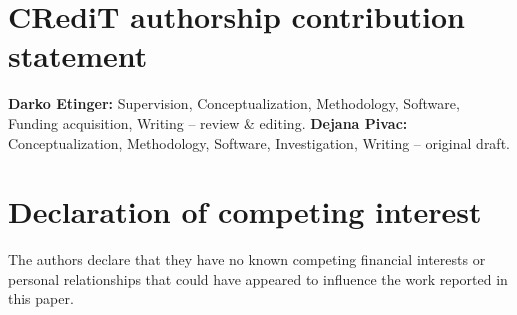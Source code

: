 %
%
%     
%

\section*{CRediT authorship contribution statement}

\textbf{Darko Etinger:} Supervision, Conceptualization, Methodology,
Software, Funding acquisition, Writing -- review \& editing.
\textbf{Dejana Pivac:} Conceptualization, Methodology, Software,
Investigation, Writing -- original draft.

\section*{Declaration of competing interest}

The authors declare that they have no known competing financial interests or
personal relationships that could have appeared to influence the work reported
in this paper.

